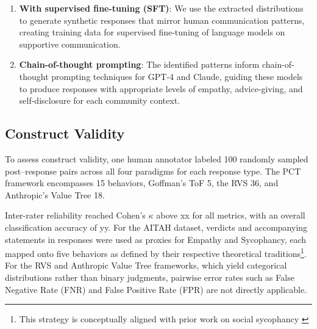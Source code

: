 \begin{enumerate}
    \item \textbf{With supervised fine-tuning (SFT)}: We use the extracted distributions to generate synthetic responses that mirror human communication patterns, creating training data for supervised fine-tuning of language models on supportive communication.
    
    \item \textbf{Chain-of-thought prompting}: The identified patterns inform chain-of-thought prompting techniques for GPT-4 and Claude, guiding these models to produce responses with appropriate levels of empathy, advice-giving, and self-disclosure for each community context.
\end{enumerate}

\subsection{Construct Validity}
To assess construct validity, one human annotator labeled 100 randomly sampled post–response pairs across all four paradigms for each response type. The PCT framework encompasses 15 behaviors, Goffman’s ToF 5, the RVS 36, and Anthropic’s Value Tree 18.

Inter-rater reliability reached Cohen’s $\kappa$ above xx for all metrics, with an overall classification accuracy of yy. For the AITAH dataset, verdicts and accompanying statements in responses were used as proxies for Empathy and Sycophancy, each mapped onto five behaviors as defined by their respective theoretical traditions\footnote{This strategy is conceptually aligned with prior work on social sycophancy \cite{cheng-etal-sycophancy}}.
For the RVS and Anthropic Value Tree frameworks, which yield categorical distributions rather than binary judgments, pairwise error rates such as False Negative Rate (FNR) and False Positive Rate (FPR) are not directly applicable.





